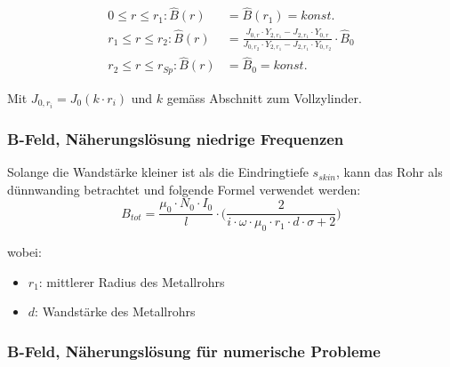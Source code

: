 \begin{align}
    \label{eq:hohlzylinder:BExact}
    0 \leq r \leq r_1:      \hat{B} (r) & = \hat{B} (r_1) = konst. \\
    r_1 \leq r \leq r_2:    \hat{B} (r) & = \frac{J_{0,r} \cdot Y_{2,r_1} - J_{2,r_1} \cdot Y_{0,r}}{J_{0,r_2} \cdot Y_{2,r_1} - J_{2,r_1} \cdot Y_{0,r_2}} \cdot \hat{B}_0 \\
    r_2 \leq r \leq r_{Sp}: \hat{B} (r) & = \hat{B}_0 = konst.
\end{align}

Mit $J_{0,r_i} = J_0 (k \cdot r_i)$ und $k$ gem\"ass Abschnitt zum Vollzylinder.

\subsubsection{B-Feld, N\"aherungsl\"osung niedrige Frequenzen}
\label{sec:arbgru:subsec:hohlzylinder:BApprox}

Solange die  Wandst\"arke kleiner ist  als die Eindringtiefe  $s_{skin}$, kann
das Rohr als d\"unnwanding betrachtet und folgende Formel verwendet werden:
\begin{equation}
    \label{eq:hohlzylinder:BApprox}
    B_{tot} = \frac{\mu_0 \cdot N_0 \cdot I_0}{l} \cdot \Biggl( \frac{2}{i \cdot \omega \cdot \mu_0 \cdot r_1 \cdot d \cdot \sigma + 2} \Biggr)
\end{equation}


wobei:

\begin{itemize}
    \item[]
        $r_1$: mittlerer Radius des Metallrohrs
    \item[]
        $d$: Wandst\"arke des Metallrohrs
\end{itemize}

\subsubsection{B-Feld, N\"aherungsl\"osung f\"ur numerische Probleme}
\label{sec:arbgru:subsec:hohlzylinder:BApprox2}

